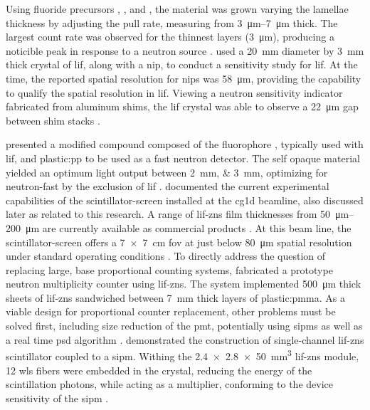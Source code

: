 \documentclass[../../../../main.tex]{subfiles}%
\begin{document}
    Using fluoride precursors , , and , the material was grown varying the lamellae thickness by adjusting the pull rate, measuring from \SIrange{3}{7}{\micro\meter} thick.
    The largest count rate was observed for the thinnest layers (\SI{3}{\micro\meter}), producing a noticible peak in response to a  neutron source \cite{Kawaguchi_2011}.
    \citeauthor*{Matsubayashi_2011} used a \SI{20}{\milli\meter} diameter by \SI{3}{\milli\meter} thick crystal of \gls{lif}, along with a \gls{nip}, to conduct a sensitivity study for \gls{lif}.
    At the time, the reported spatial resolution for \glspl{nip} was \SI{58}{\micro\meter}, providing the capability to qualify the spatial resolution in \gls{lif}.
    Viewing a neutron sensitivity indicator fabricated from aluminum shims, the \gls{lif} crystal was able to observe a \SI{22}{\micro\meter} gap between shim stacks \cite{Matsubayashi_2011}.
    \par%
    \citeauthor*{Yang_2013} presented a modified compound composed of the fluorophore , typically used with \gls{lif}, and \gls{plastic:pp} to be used as a fast neutron detector.
    The self opaque material yielded an optimum light output between \SIlist{2; 3}{\milli\meter}, optimizing for \gls{neutron-fast} by the exclusion of \gls{lif} \cite{Yang_2013}.
    \citeauthor*{Santodonato_2015} documented the current experimental capabilities of the \gls{scintillator-screen} installed at the \gls{cg1d} \gls{beamline}, also discussed later as related to this research.
    A range of \gls{lif-zns} film thicknesses from \SIrange{50}{200}{\micro\meter} are currently available as commercial products \cite{website:RC-TRITEC}.
    At this beam line, the \gls{scintillator-screen} offers a \SI{7x7}{\centi\meter} \gls{fov} at just below \SI{80}{\micro\meter} spatial resolution under standard operating conditions \cite{Santodonato_2015}.
    To directly address the question of replacing large,  base proportional counting systems, \citeauthor*{Stave_2015} fabricated a prototype neutron multiplicity counter using \gls{lif-zns}.
    The system implemented \SI{500}{\micro\meter} thick sheets of \gls{lif-zns} sandwiched between \SI{7}{\milli\meter} thick layers of \gls{plastic:pmma}.
    As a viable design for  proportional counter replacement, other problems must be solved first, including size reduction of the \gls{pmt}, potentially using \glspl{sipm} as well as a real time \gls{psd} algorithm \cite{Stave_2015}.
    \citeauthor*{Stoykov_2015} demonstrated the construction of single-channel \gls{lif-zns} scintillator coupled to a \gls{sipm}.
    Withing the \SI{2.4 x 2.8 x 50}{\milli\meter\cubed} \gls{lif-zns} module, \num{12} \gls{wls} fibers were embedded in the crystal, reducing the energy of the scintillation photons, while acting as a multiplier, conforming to the device sensitivity of the \gls{sipm} \cite{Stoykov_2015}.
\end{document}
